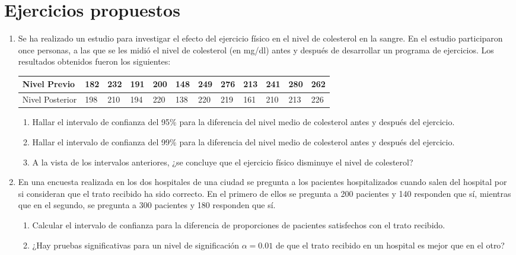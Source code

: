 \begin{enumerate}[leftmargin=*]
\end{enumerate}



\section{Ejercicios propuestos}
\begin{enumerate}[leftmargin=*] 
\item  Se ha realizado un estudio para investigar el efecto del ejercicio físico en el nivel de colesterol en la sangre. En el estudio
participaron once personas, a las que se les midió el nivel de colesterol (en mg/dl) antes y después de desarrollar un programa de
ejercicios. Los resultados obtenidos fueron los siguientes:
\begin{center}
\begin{tabular}{|l|l|l|l|l|l|l|l|l|l|l|l|}
\hline
Nivel Previo & 182 & 232 & 191 & 200 & 148 & 249 & 276 & 213 & 241 & 280 & 262 \\
\hline
Nivel Posterior & 198 & 210 & 194 & 220 & 138 & 220 & 219 & 161 & 210 & 213 & 226 \\
\hline
\end{tabular}
\end{center}

\begin{enumerate}
\item Hallar el intervalo de confianza del 95\% para la diferencia del nivel medio de colesterol antes y después del
ejercicio.
\item Hallar el intervalo de confianza del 99\% para la diferencia del nivel medio de colesterol antes y después del
ejercicio.
\item A la vista de los intervalos anteriores, ¿se concluye que el ejercicio físico disminuye el nivel de colesterol?
\end {enumerate}

\item En una encuesta realizada en los dos hospitales de una ciudad se pregunta a los pacientes hospitalizados cuando salen del hospital por
si consideran que el trato recibido ha sido correcto. En el primero de ellos se pregunta a 200 pacientes y 140 responden que sí, mientras
que en el segundo, se pregunta a 300 pacientes y 180 responden que sí.

\begin{enumerate}
\item Calcular el intervalo de confianza para la diferencia de proporciones de pacientes satisfechos con el trato recibido.
\item ¿Hay pruebas significativas para un nivel de significación $\alpha=0.01$ de que el trato recibido en un hospital es mejor que en el
otro?
\end{enumerate}


\end{enumerate}
